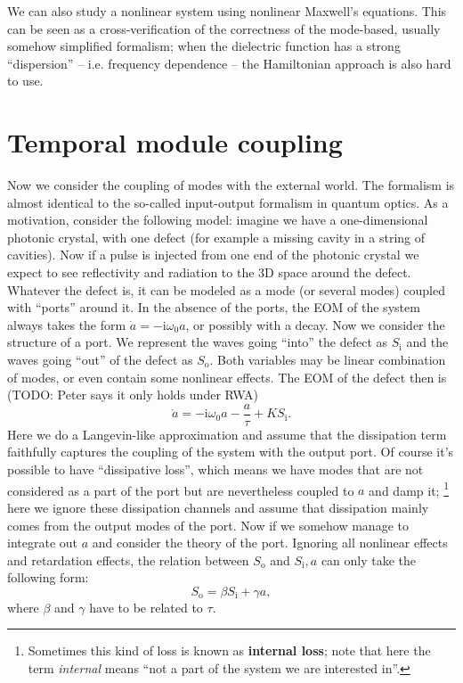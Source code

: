 \documentclass[hyperref, a4paper]{article}
\newcommand*{\ii}{\mathrm{i}}
\newcommand*{\concept}[1]{{\textbf{#1}}}
\newcommand*{\term}[1]{\textit{#1}}
\newcommand*{\Si}{S_{\text{i}}}
\newcommand*{\So}{S_{\text{o}}}
\begin{document}
We can also study a nonlinear system using nonlinear Maxwell's equations.
This can be seen as a cross-verification of the correctness 
of the mode-based, usually somehow simplified formalism;
when the dielectric function has a strong ``dispersion'' -- i.e. frequency dependence -- 
the Hamiltonian approach is also hard to use.

\section{Temporal module coupling}

Now we consider the coupling of modes with the external world.
The formalism is almost identical to the so-called input-output formalism in quantum optics.
As a motivation, consider the following model: 
imagine we have a one-dimensional photonic crystal, 
with one defect (for example a missing cavity in a string of cavities).
Now if a pulse is injected from one end of the photonic crystal 
we expect to see reflectivity and radiation to the 3D space around the defect.
Whatever the defect is, it can be modeled as a mode (or several modes)
coupled with ``ports'' around it.
In the absence of the ports, the EOM of the system always takes the form 
$\dot{a} = - \ii \omega_0 a$, 
or possibly with a decay. 
Now we consider the structure of a port. 
We represent the waves going ``into'' the defect as $\Si$
and the waves going ``out'' of the defect as $\So$.
Both variables may be linear combination of modes, 
or even contain some nonlinear effects.
The EOM of the defect then is (TODO: Peter says it only holds under RWA) 
\begin{equation}
    \dot{a} = - \ii \omega_0 a - \frac{a}{\tau} + K \Si.
\end{equation}
Here we do a Langevin-like approximation and assume that the dissipation term 
faithfully captures the coupling of the system with the output port.
Of course it's possible to have ``dissipative loss'', 
which means we have modes that are not considered as a part of the port 
but are nevertheless coupled to $a$ and damp it;%
\footnote{
    Sometimes this kind of loss is known as \concept{internal loss}; 
    note that here the term \term{internal} means ``not a part of the system we are interested in''. 
}
here we ignore these dissipation channels and assume that 
dissipation mainly comes from the output modes of the port.
Now if we somehow manage to integrate out $a$ 
and consider the theory of the port.
Ignoring all nonlinear effects and retardation effects, 
the relation between $\So$ and $\Si, a$ can only take the following form: 
\begin{equation}
    \So = \beta \Si + \gamma a, 
\end{equation}
where $\beta$ and $\gamma$ have to be related to $\tau$.
\end{document}
